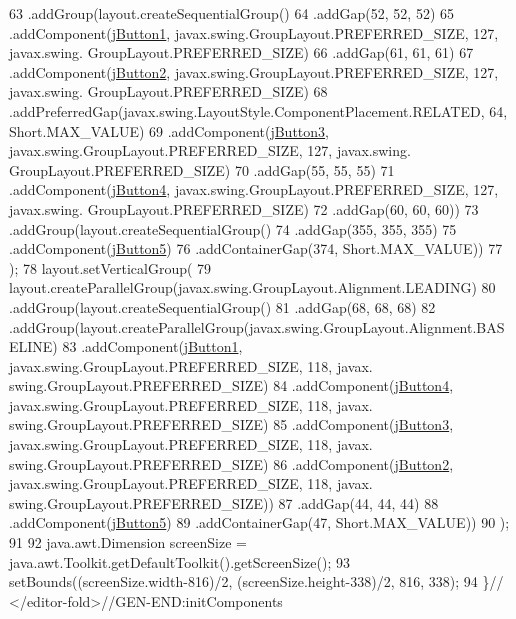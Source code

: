\begin{DoxyCode}
63             .addGroup(layout.createSequentialGroup()
64                 .addGap(52, 52, 52)
65                 .addComponent(\mbox{\hyperlink{class_sockets_1_1_colores_ab40711ac8b3b4ea81488754689d89db6}{jButton1}}, javax.swing.GroupLayout.PREFERRED\_SIZE, 127, javax.swing.
      GroupLayout.PREFERRED\_SIZE)
66                 .addGap(61, 61, 61)
67                 .addComponent(\mbox{\hyperlink{class_sockets_1_1_colores_a4f1d1e8c1b92fee9bca285f52bf66b84}{jButton2}}, javax.swing.GroupLayout.PREFERRED\_SIZE, 127, javax.swing.
      GroupLayout.PREFERRED\_SIZE)
68                 .addPreferredGap(javax.swing.LayoutStyle.ComponentPlacement.RELATED, 64, Short.MAX\_VALUE)
69                 .addComponent(\mbox{\hyperlink{class_sockets_1_1_colores_a7bba899d5ca449162ba9e0b7b3ae4264}{jButton3}}, javax.swing.GroupLayout.PREFERRED\_SIZE, 127, javax.swing.
      GroupLayout.PREFERRED\_SIZE)
70                 .addGap(55, 55, 55)
71                 .addComponent(\mbox{\hyperlink{class_sockets_1_1_colores_ac555b14a5e9aa5fd552356f04d884d31}{jButton4}}, javax.swing.GroupLayout.PREFERRED\_SIZE, 127, javax.swing.
      GroupLayout.PREFERRED\_SIZE)
72                 .addGap(60, 60, 60))
73             .addGroup(layout.createSequentialGroup()
74                 .addGap(355, 355, 355)
75                 .addComponent(\mbox{\hyperlink{class_sockets_1_1_colores_a4cacc03eb161c98ee51cfdd6970ecd35}{jButton5}})
76                 .addContainerGap(374, Short.MAX\_VALUE))
77         );
78         layout.setVerticalGroup(
79             layout.createParallelGroup(javax.swing.GroupLayout.Alignment.LEADING)
80             .addGroup(layout.createSequentialGroup()
81                 .addGap(68, 68, 68)
82                 .addGroup(layout.createParallelGroup(javax.swing.GroupLayout.Alignment.BASELINE)
83                     .addComponent(\mbox{\hyperlink{class_sockets_1_1_colores_ab40711ac8b3b4ea81488754689d89db6}{jButton1}}, javax.swing.GroupLayout.PREFERRED\_SIZE, 118, javax.
      swing.GroupLayout.PREFERRED\_SIZE)
84                     .addComponent(\mbox{\hyperlink{class_sockets_1_1_colores_ac555b14a5e9aa5fd552356f04d884d31}{jButton4}}, javax.swing.GroupLayout.PREFERRED\_SIZE, 118, javax.
      swing.GroupLayout.PREFERRED\_SIZE)
85                     .addComponent(\mbox{\hyperlink{class_sockets_1_1_colores_a7bba899d5ca449162ba9e0b7b3ae4264}{jButton3}}, javax.swing.GroupLayout.PREFERRED\_SIZE, 118, javax.
      swing.GroupLayout.PREFERRED\_SIZE)
86                     .addComponent(\mbox{\hyperlink{class_sockets_1_1_colores_a4f1d1e8c1b92fee9bca285f52bf66b84}{jButton2}}, javax.swing.GroupLayout.PREFERRED\_SIZE, 118, javax.
      swing.GroupLayout.PREFERRED\_SIZE))
87                 .addGap(44, 44, 44)
88                 .addComponent(\mbox{\hyperlink{class_sockets_1_1_colores_a4cacc03eb161c98ee51cfdd6970ecd35}{jButton5}})
89                 .addContainerGap(47, Short.MAX\_VALUE))
90         );
91 
92         java.awt.Dimension screenSize = java.awt.Toolkit.getDefaultToolkit().getScreenSize();
93         setBounds((screenSize.width-816)/2, (screenSize.height-338)/2, 816, 338);
94     \}\textcolor{comment}{// </editor-fold>//GEN-END:initComponents}
\end{DoxyCode}
